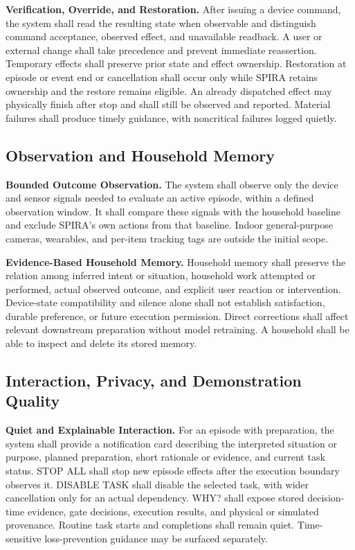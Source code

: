 \documentclass[conference]{IEEEtran}
\begin{document}
\textbf{Verification, Override, and Restoration.} After issuing a device command, the system shall read the resulting state when observable and distinguish command acceptance, observed effect, and unavailable readback. A user or external change shall take precedence and prevent immediate reassertion. Temporary effects shall preserve prior state and effect ownership. Restoration at episode or event end or cancellation shall occur only while SPIRA retains ownership and the restore remains eligible. An already dispatched effect may physically finish after stop and shall still be observed and reported. Material failures shall produce timely guidance, with noncritical failures logged quietly.

\subsection{Observation and Household Memory}
\textbf{Bounded Outcome Observation.} The system shall observe only the device and sensor signals needed to evaluate an active episode, within a defined observation window. It shall compare these signals with the household baseline and exclude SPIRA's own actions from that baseline. Indoor general-purpose cameras, wearables, and per-item tracking tags are outside the initial scope.

\textbf{Evidence-Based Household Memory.} Household memory shall preserve the relation among inferred intent or situation, household work attempted or performed, actual observed outcome, and explicit user reaction or intervention. Device-state compatibility and silence alone shall not establish satisfaction, durable preference, or future execution permission. Direct corrections shall affect relevant downstream preparation without model retraining. A household shall be able to inspect and delete its stored memory.

\subsection{Interaction, Privacy, and Demonstration Quality}
\textbf{Quiet and Explainable Interaction.} For an episode with preparation, the system shall provide a notification card describing the interpreted situation or purpose, planned preparation, short rationale or evidence, and current task status. STOP ALL shall stop new episode effects after the execution boundary observes it. DISABLE TASK shall disable the selected task, with wider cancellation only for an actual dependency. WHY? shall expose stored decision-time evidence, gate decisions, execution results, and physical or simulated provenance. Routine task starts and completions shall remain quiet. Time-sensitive loss-prevention guidance may be surfaced separately.
\end{document}
